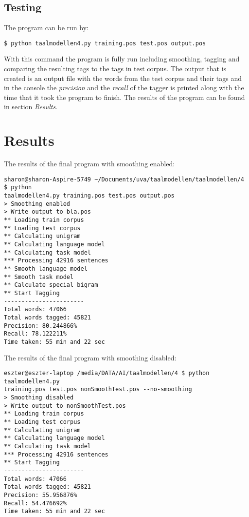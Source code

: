 \documentclass[10pt, a4paper]{article}
\begin{document}
\subsection*{Testing}
The program can be run by:
\begin{verbatim}
$ python taalmodellen4.py training.pos test.pos output.pos
\end{verbatim}

With this command the program is fully run including smoothing, tagging and comparing the resulting tags to the tags in test corpus. The output that is created is an output file with the words from the test corpus and their tags and in the console the \textit{precision} and the \textit{recall} of the tagger is printed along with the time that it took the program to finish. The results of the program can be found in section \textit{Results}.

\section*{Results}

\noindent The results of the final program with smoothing enabled:
\begin{verbatim}
sharon@sharon-Aspire-5749 ~/Documents/uva/taalmodellen/taalmodellen/4 $ python 
taalmodellen4.py training.pos test.pos output.pos
> Smoothing enabled
> Write output to bla.pos
** Loading train corpus
** Loading test corpus
** Calculating unigram
** Calculating language model
** Calculating task model
*** Processing 42916 sentences
** Smooth language model
** Smooth task model
** Calculate special bigram
** Start Tagging
-----------------------
Total words: 47066
Total words tagged: 45821
Precision: 80.244866%
Recall: 78.122211%
Time taken: 55 min and 22 sec
\end{verbatim}

\noindent The results of the final program with smoothing disabled:
\begin{verbatim}
eszter@eszter-laptop /media/DATA/AI/taalmodellen/4 $ python taalmodellen4.py 
training.pos test.pos nonSmoothTest.pos --no-smoothing
> Smoothing disabled
> Write output to nonSmoothTest.pos
** Loading train corpus
** Loading test corpus
** Calculating unigram
** Calculating language model
** Calculating task model
*** Processing 42916 sentences
** Start Tagging
-----------------------
Total words: 47066
Total words tagged: 45821
Precision: 55.956876%
Recall: 54.476692%
Time taken: 55 min and 22 sec
\end{verbatim}
\end{document}
